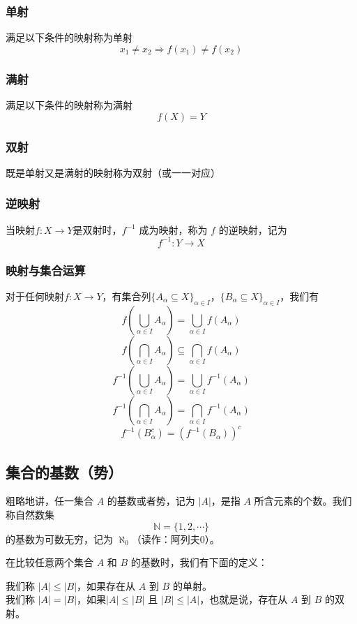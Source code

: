 \documentclass{ctexbook}
\newcommand{\no}{\noindent}
\begin{document}
\subsubsection{单射}
满足以下条件的映射称为单射
\[
	x_1 \ne x_2 \Rightarrow f(x_1) \ne f(x_2)
\]
\subsubsection{满射}
满足以下条件的映射称为满射
\[
	f(X)=Y
\]
\subsubsection{双射}

既是单射又是满射的映射称为双射（或一一对应）
\subsubsection{逆映射}

当映射$f:X\rightarrow Y$是双射时，$f^{-1}$ 成为映射，称为 $f$ 的逆映射，记为
\[
	f^{-1}:Y\rightarrow X
\]

\subsubsection{映射与集合运算}

对于任何映射$f:X\rightarrow Y$，有集合列$\{A_\alpha\subseteq X\}_{\alpha\in I}$，$\{B_\alpha\subseteq X\}_{\alpha\in I}$，我们有
\[f\left(\bigcup_{\alpha\in I} A_\alpha\right) = \bigcup_{\alpha\in I}f(A_\alpha)\]
\[f\left(\bigcap_{\alpha\in I} A_\alpha\right) \subseteq \bigcap_{\alpha\in I}f(A_\alpha)\]
\[f^{-1}\left(\bigcup_{\alpha\in I} A_\alpha\right) = \bigcup_{\alpha\in I}f^{-1}(A_\alpha)\]
\[f^{-1}\left(\bigcap_{\alpha\in I} A_\alpha\right) = \bigcap_{\alpha\in I}f^{-1}(A_\alpha)\]
\[f^{-1}\left(B_\alpha^c\right) = \left(f^{-1}(B_\alpha)\right)^c\]


\subsection{集合的基数（势）}

粗略地讲，任一集合 $A$ 的基数或者势，记为 $|A|$，是指 $A$ 所含元素的个数。我们称自然数集
\[
	\mathbb{N}=\{1,2,\cdots\}
\]
的基数为可数无穷，记为 $\aleph_0$（读作：阿列夫0）。

在比较任意两个集合 $A$ 和 $B$ 的基数时，我们有下面的定义：

\no {\bf 定义1} 我们称 $\lvert A \rvert \le \lvert B \rvert$，如果存在从 $A$ 到 $B$ 的单射。\\
\no {\bf 定义2} 我们称 $\lvert A \rvert = \lvert B \rvert$，如果$\lvert A \rvert \le \lvert B \rvert$ 且 $\lvert B \rvert \le \lvert A \rvert$，也就是说，存在从 $A$ 到 $B$ 的双射。\\
\end{document}
